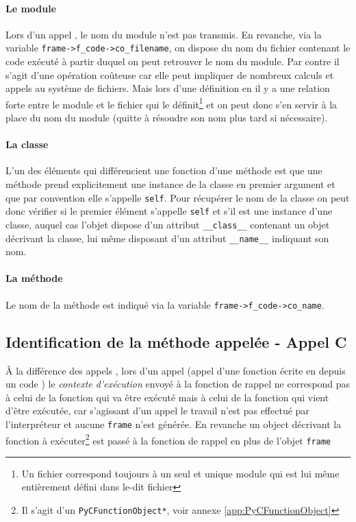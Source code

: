 \paragraph*{Le module} Lors d'un appel \Python, le nom du module n'est pas transmis. En revanche,  via la variable \verb|frame->f_code->co_filename|, on dispose du nom du fichier contenant le code exécuté à partir duquel on peut retrouver le nom du module. Par contre il s'agit d'une opération coûteuse car elle peut impliquer de nombreux calculs et appels au système de fichiers. Mais lors d'une définition en \Python il y a une relation forte entre le module et le fichier qui le définit\footnote{Un fichier correspond toujours à un seul et unique module qui est lui même entièrement défini dans le-dit fichier} et on peut donc s'en servir à la place du nom du module (quitte à résoudre son nom plus tard si nécessaire).

\paragraph*{La classe} L'un des éléments qui différencient une fonction d'une méthode est que une méthode prend explicitement une instance de la classe en premier argument et que par convention elle s'appelle \verb|self|. Pour récupérer le nom de la classe on peut donc vérifier si le premier élément s'appelle \verb|self| et s'il est une instance d'une classe, auquel cas l'objet dispose d'un attribut \verb|__class__| contenant un objet décrivant la classe, lui même disposant d'un attribut \verb|__name__| indiquant son nom.

\paragraph*{La méthode} Le nom de la méthode est indiqué via la variable \verb|frame->f_code->co_name|.

\subsection{Identification de la méthode appelée - Appel C}
À la différence des appels \Python, lors d'un appel \C (appel d'une fonction écrite en \C depuis un code \Python) le \emph{\gls{contexte d'exécution}} envoyé à la fonction de rappel ne correspond pas à celui de la fonction qui va être exécuté mais à celui de la fonction qui vient d'être exécutée, car s'agissant d'un appel \C le travail n'est pas effectué par l'interpréteur et aucune \verb|frame| n'est générée. En revanche un object décrivant la fonction \C à exécuter\footnote{Il s'agit d'un \verb|PyCFunctionObject*|, voir annexe \vref{app:PyCFunctionObject}} est passé à la fonction de rappel en plus de l'objet \verb|frame|

